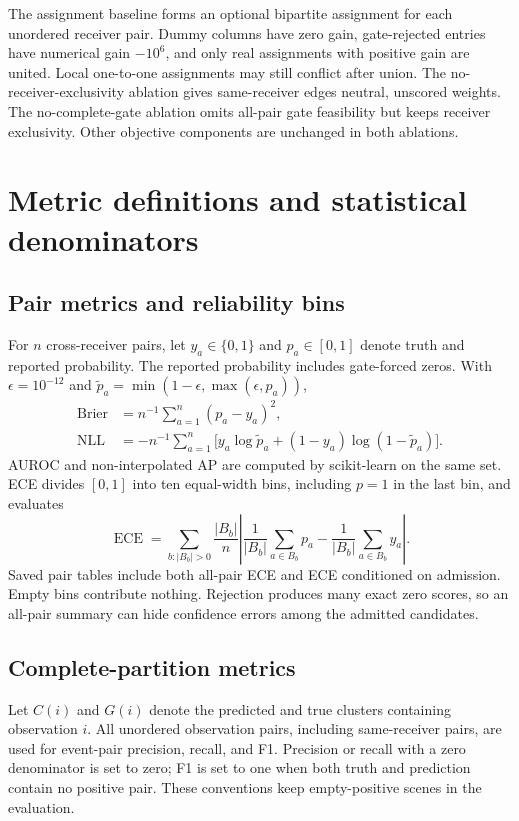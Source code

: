 \documentclass[10pt,a4paper]{article}
\begin{document}
The assignment baseline forms an optional bipartite assignment for each unordered receiver pair. Dummy columns have zero gain, gate-rejected entries have numerical gain $-10^6$, and only real assignments with positive gain are united. Local one-to-one assignments may still conflict after union. The no-receiver-exclusivity ablation gives same-receiver edges neutral, unscored weights. The no-complete-gate ablation omits all-pair gate feasibility but keeps receiver exclusivity. Other objective components are unchanged in both ablations.

\section{Metric definitions and statistical denominators}
\subsection{Pair metrics and reliability bins}
For $n$ cross-receiver pairs, let $y_a\in\{0,1\}$ and $p_a\in[0,1]$ denote truth and reported probability. The reported probability includes gate-forced zeros. With $\epsilon=10^{-12}$ and $\widetilde p_a=\min(1-\epsilon,\max(\epsilon,p_a))$,
\begin{align}
 \operatorname{Brier}&=n^{-1}\sum_{a=1}^{n}(p_a-y_a)^2,\\
 \operatorname{NLL}&=-n^{-1}\sum_{a=1}^{n}\big[y_a\log\widetilde p_a+(1-y_a)\log(1-\widetilde p_a)\big].
\end{align}
AUROC and non-interpolated AP are computed by scikit-learn on the same set. ECE divides $[0,1]$ into ten equal-width bins, including $p=1$ in the last bin, and evaluates
\begin{equation}
 \operatorname{ECE}=\sum_{b:|B_b|>0}\frac{|B_b|}{n}
 \left|\frac{1}{|B_b|}\sum_{a\in B_b}p_a-
 \frac{1}{|B_b|}\sum_{a\in B_b}y_a\right|.
\end{equation}
Saved pair tables include both all-pair ECE and ECE conditioned on admission. Empty bins contribute nothing. Rejection produces many exact zero scores, so an all-pair summary can hide confidence errors among the admitted candidates.

\subsection{Complete-partition metrics}
Let $C(i)$ and $G(i)$ denote the predicted and true clusters containing observation $i$. All unordered observation pairs, including same-receiver pairs, are used for event-pair precision, recall, and F1. Precision or recall with a zero denominator is set to zero; F1 is set to one when both truth and prediction contain no positive pair. These conventions keep empty-positive scenes in the evaluation.
\end{document}
